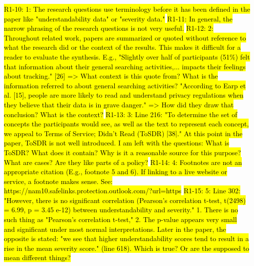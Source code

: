 \hl{R1-10: 1: The research questions use terminology before it has been defined in the paper
like  "understandability data" or "severity data."}
\hl{R1-11: In general, the
narrow phrasing of the research questions is not very useful.}
\hl{R1-12: 2: Throughout related work, papers are summarized or quoted without reference to
what the research did or the context of the results. This makes it
difficult for a reader to evaluate the synthesis. E.g., "Slightly over
half of participants (51\%) felt that information about their general
searching activities,... impacts their feelings about tracking." [26]
=> What context is this quote from? What is the information referred
to about general searching activities? "According to Earp et al. [15],
people are more likely to read and understand privacy regulations when
they believe that their data is in grave danger." => How did they draw
that conclusion? What is the context?}
\hl{R1-13: 3: Line 216: "To determine the set of concepts the participants would see, as well
as the text to represent each concept, we appeal to Terms of Service;
Didn't Read (ToSDR) [38]." At this point in the paper, ToSDR is not
well introduced. I am left with the questions: What is ToSDR? What
does it contain? Why is it a reasonable source for this purpose? What
are cases? Are they like parts of a policy?}
\hl{R1-14: 4: Footnotes are not an appropriate citation (E.g., footnote 5 and 6). If linking
to a live website or service, a footnote makes sense.  See:
https://nam10.safelinks.protection.outlook.com/?url=https%
}
\hl{R1-15: 5: Line 302: "However, there is no significant correlation (Pearson's correlation
t-test, t(2498) = 6.99, p = 3.45 e-12) between understandability and
severity." 1. There is no such thing as "Pearson's correlation
t-test,"  2. The p-value appears very small and significant under most
normal interpretations. Later in the paper, the opposite is stated:
"we see that higher understandability scores tend to result in a rise
in the mean severity score." (line 618). Which is true? Or are the
supposed to mean different things?}
